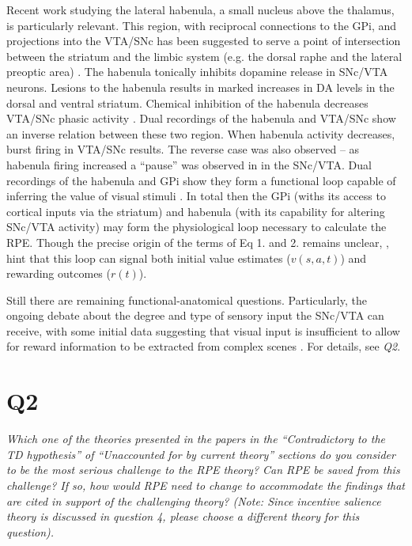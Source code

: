 \documentclass[doc]{apa}        %
\begin{document}
Recent work studying the lateral habenula, a small nucleus above the thalamus, is particularly relevant.  This region, with reciprocal connections to the GPi, and projections into the VTA/SNc has been suggested to serve a point of intersection between the striatum and the limbic system (e.g. the dorsal raphe and the lateral preoptic area) \cite{Hikosaka:2008p4455}.  The habenula tonically inhibits dopamine release in SNc/VTA neurons.  Lesions to the habenula results in marked increases in DA levels in the dorsal and ventral striatum.  Chemical inhibition of the habenula decreases VTA/SNc phasic activity \cite{BrombergMartin:2010p7221}. Dual recordings of the habenula and VTA/SNc show an inverse relation between these two region.  When habenula activity decreases, burst firing in VTA/SNc results.  The reverse case was also observed -- as habenula firing increased a ``pause'' was observed in in the SNc/VTA.  Dual recordings of the habenula and GPi show they form a functional loop capable of inferring the value of visual stimuli \cite{BrombergMartin:2010p7221}.  In total then the GPi (withs its access to cortical inputs via the striatum) and habenula (with its capability for altering SNc/VTA activity) may form the physiological loop necessary to calculate the RPE. Though the precise origin of the terms of Eq 1. and 2. remains unclear, , hint that this loop can signal both initial value estimates ($v(s,a,t)$) and rewarding outcomes ($r(t)$).

Still there are remaining functional-anatomical questions.  Particularly, the ongoing debate about the degree and type of sensory input the SNc/VTA can receive, with some initial data suggesting that visual input is insufficient to allow for reward information to be extracted from complex scenes .  For details, see \emph{Q2}.

\newpage
\section{Q2} %
\label{sec:q2}
\emph{Which one of the theories presented in the papers in the “Contradictory to the TD hypothesis” of “Unaccounted for by current theory” sections do you consider to be the most serious challenge to the RPE theory?  Can RPE be saved from this challenge?  If so, how would RPE need to change to accommodate the findings that are cited in support of the challenging theory?  (Note: Since incentive salience theory is discussed in question 4, please choose a different theory for this question).}
\end{document}
